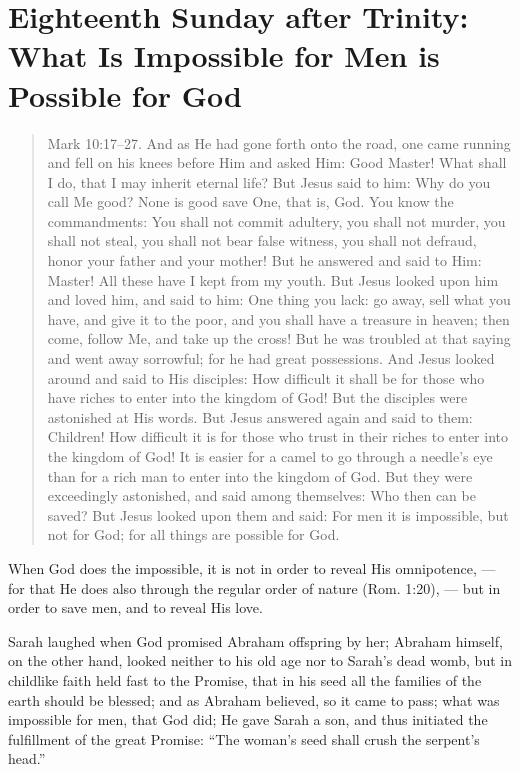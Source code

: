 
\section{Eighteenth Sunday after Trinity: What Is Impossible for Men is Possible for God}

\begin{quote}

Mark 10:17–27. And as He had gone forth onto the road, one came running and fell on his knees before Him and asked Him: Good Master! What shall I do, that I may inherit eternal life? But Jesus said to him: Why do you call Me good? None is good save One, that is, God. You know the commandments: You shall not commit adultery, you shall not murder, you shall not steal, you shall not bear false witness, you shall not defraud, honor your father and your mother! But he answered and said to Him: Master! All these have I kept from my youth. But Jesus looked upon him and loved him, and said to him: One thing you lack: go away, sell what you have, and give it to the poor, and you shall have a treasure in heaven; then come, follow Me, and take up the cross! But he was troubled at that saying and went away sorrowful; for he had great possessions. And Jesus looked around and said to His disciples: How difficult it shall be for those who have riches to enter into the kingdom of God! But the disciples were astonished at His words. But Jesus answered again and said to them: Children! How difficult it is for those who trust in their riches to enter into the kingdom of God! It is easier for a camel to go through a needle’s eye than for a rich man to enter into the kingdom of God. But they were exceedingly astonished, and said among themselves: Who then can be saved? But Jesus looked upon them and said: For men it is impossible, but not for God; for all things are possible for God.

\end{quote}

\bigskip

When God does the impossible, it is not in order to reveal His omnipotence, — for that He does also through the regular order of nature (Rom. 1:20), — but in order to save men, and to reveal His love.

Sarah laughed when God promised Abraham offspring by her; Abraham himself, on the other hand, looked neither to his old age nor to Sarah’s dead womb, but in childlike faith held fast to the Promise, that in his seed all the families of the earth should be blessed; and as Abraham believed, so it came to pass; what was impossible for men, that God did; He gave Sarah a son, and thus initiated the fulfillment of the great Promise: “The woman’s seed shall crush the serpent’s head.”

